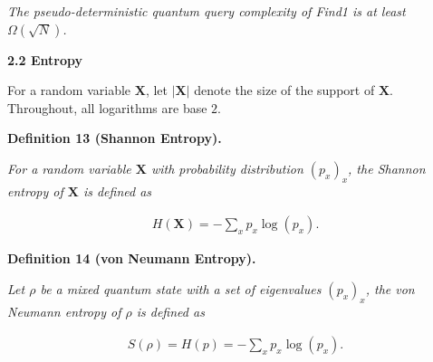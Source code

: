\documentclass[10pt,a4paper]{article}
\begin{document}
\emph{The pseudo-deterministic quantum query complexity of Find1 is at least $\Omega(\sqrt{N})$.}\par







\par\medskip\noindent\textbf{
2.2 Entropy}\par




For a random variable $\mathbf{X}$, let $|\mathbf{X}|$ denote the size of the support of $\mathbf{X}$. Throughout, all logarithms are base $2$.\par





\par\medskip\noindent\textbf{
\textbf{Definition 13}\textbf{ }(Shannon Entropy)\textbf{.}
}\par



\emph{For a random variable $\mathbf{X}$ with probability distribution $(p_{x})_{x}$, the Shannon entropy of $\mathbf{X}$ is defined as}\par


\[\begin{gathered}
H(\mathbf{X})=-\sum_{x}p_{x}\log(p_{x}).
\end{gathered}\]







\par\medskip\noindent\textbf{
\textbf{Definition 14}\textbf{ }(von Neumann Entropy)\textbf{.}
}\par



\emph{Let $\rho$ be a mixed quantum state with a set of eigenvalues $(p_{x})_{x}$, the von Neumann entropy of $\rho$ is defined as}\par


\[\begin{gathered}
S(\rho)=H(p)=-\sum_{x}p_{x}\log(p_{x}).
\end{gathered}\]





\end{document}
